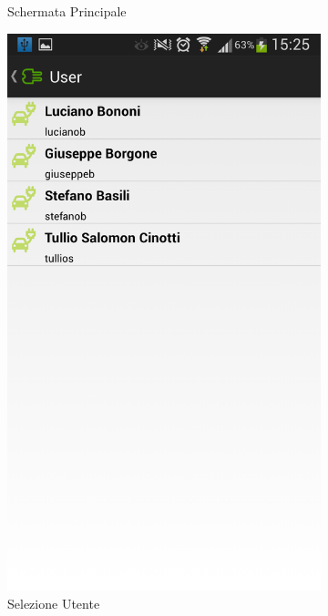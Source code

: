 \begin{figure}
\begin{subfigure}{0.45\textwidth}
		\caption{Schermata Principale}
		\label{fig:main-activity}
	\end{subfigure}
	\begin{subfigure}{0.45\textwidth}
		\includegraphics[width=\textwidth]{assets/mobile-app-select-user.png}
		\caption{Selezione Utente}
		\label{fig:select-user}
    \end{subfigure}
    	\begin{subfigure}{0.45\textwidth}

\end{subfigure}
\end{figure}

